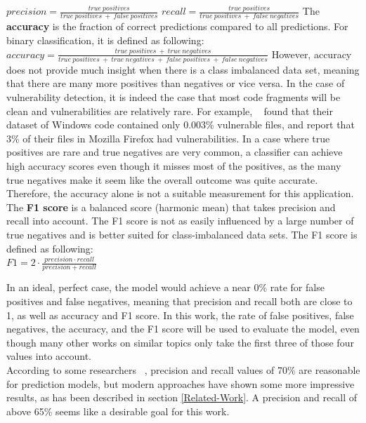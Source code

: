 \documentclass[
	a4paper,
	pagesize,
	pdftex,
	12pt,
	twoside, %
	BCOR=5mm, %
	ngerman,
	fleqn,
	final,
	]{scrartcl}
\begin{document}
\mbox{}\newline
$precision = \frac{true~positives}{true~positives~+~false~positives}$\newline
\mbox{}\newline
$recall = \frac{true~positives}{true~positives~+~false~negatives}$\newline
\mbox{}\newline
The \textbf{accuracy} is the fraction of correct predictions compared to all predictions. For binary classification, it is defined as following:  \newline
\mbox{}\newline
$accuracy = \frac{true~positives~+~true~negatives}{true~positives~+~true~negatives~+~false~positives~+~false~negatives}$\newline
\mbox{}\newline
However, accuracy does not provide much insight when there is a class imbalanced data set, meaning that there are many more positives than negatives or vice versa. In the case of vulnerability detection, it is indeed the case that most code fragments will be clean and vulnerabilities are relatively rare. For example, ~\cite{Morrison.2015} found that their dataset of Windows code contained only 0.003\% vulnerable files, and \cite{Shin.2010} report that 3\% of their files in Mozilla Firefox had vulnerabilities. In a case where true positives are rare and true negatives are very common, a classifier can achieve high accuracy scores even though it misses most of the positives, as the many true negatives make it seem like the overall outcome was quite accurate. Therefore, the accuracy alone is not a suitable measurement for this application.\\
The \textbf{F1 score} is a balanced score (harmonic mean) that takes precision and recall into account. The F1 score is not as easily influenced by a large number of true negatives and is better suited for class-imbalanced data sets. The F1 score is defined as following:\\
\mbox{}\newline
$F1 = 2 \cdot \frac{precision \cdot recall}{precision + recall}$
\mbox{}\newline

In an ideal, perfect case, the model would achieve a near 0\% rate for false positives and false negatives, meaning that precision and recall both are close to 1, as well as accuracy and F1 score. In this work, the rate of false positives, false negatives, the accuracy, and the F1 score will be used to evaluate the model, even though many other works on similar topics only take the first three of those four values into account.\\
According to some researchers ~\cite{Morrison.2015,Shin.2013,Neuhaus.2007}, precision and recall values of 70\% are reasonable for prediction models, but modern approaches have shown some more impressive results, as has been described in section \ref{Related-Work}. A precision and recall of above 65\% seems like a desirable goal for this work.
\end{document}
